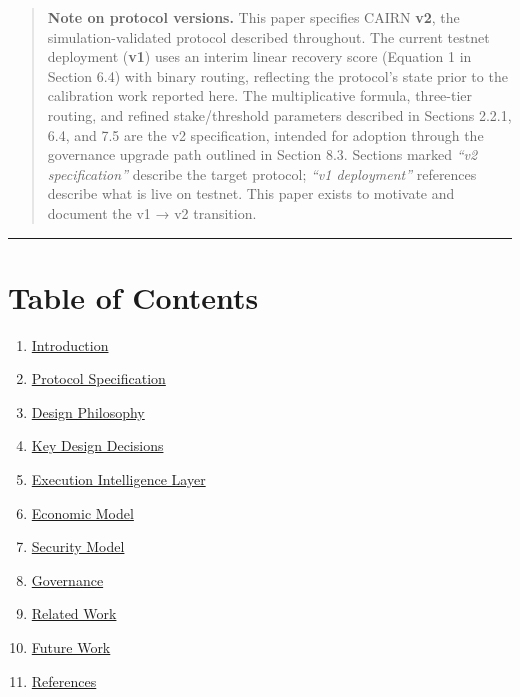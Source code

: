 \documentclass[
  10pt,
]{article}
\providecommand{\tightlist}{%
  \setlength{\itemsep}{0pt}\setlength{\parskip}{0pt}}
\begin{document}
\begin{quote}
\textbf{Note on protocol versions.} This paper specifies CAIRN
\textbf{v2}, the simulation-validated protocol described throughout. The
current testnet deployment (\textbf{v1}) uses an interim linear recovery
score (Equation 1 in Section 6.4) with binary routing, reflecting the
protocol's state prior to the calibration work reported here. The
multiplicative formula, three-tier routing, and refined stake/threshold
parameters described in Sections 2.2.1, 6.4, and 7.5 are the v2
specification, intended for adoption through the governance upgrade path
outlined in Section 8.3. Sections marked \emph{``v2 specification''}
describe the target protocol; \emph{``v1 deployment''} references
describe what is live on testnet. This paper exists to motivate and
document the v1 → v2 transition.
\end{quote}

\begin{center}\rule{0.5\linewidth}{0.5pt}\end{center}

\hypertarget{table-of-contents}{%
\section{Table of Contents}\label{table-of-contents}}

\begin{enumerate}
\def\labelenumi{\arabic{enumi}.}
\tightlist
\item
  \protect\hyperlink{1-introduction}{Introduction}
\item
  \protect\hyperlink{2-protocol-specification}{Protocol Specification}
\item
  \protect\hyperlink{3-design-philosophy}{Design Philosophy}
\item
  \protect\hyperlink{4-key-design-decisions}{Key Design Decisions}
\item
  \protect\hyperlink{5-execution-intelligence-layer}{Execution
  Intelligence Layer}
\item
  \protect\hyperlink{6-economic-model}{Economic Model}
\item
  \protect\hyperlink{7-security-model}{Security Model}
\item
  \protect\hyperlink{8-governance}{Governance}
\item
  \protect\hyperlink{9-related-work}{Related Work}
\item
  \protect\hyperlink{10-future-work}{Future Work}
\item
  \protect\hyperlink{11-references}{References}
\end{enumerate}
\end{document}
